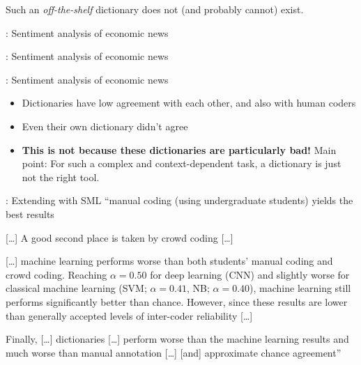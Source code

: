 \documentclass[compress]{beamer}
\begin{document}
\begin{frame}[standout]
	Such an \textit{off-the-shelf} dictionary does not (and probably cannot) exist.
\end{frame}



\begin{frame}{\cite{Boukes2020}: Sentiment analysis of economic news}
\end{frame}


\begin{frame}{\cite{Boukes2020}: Sentiment analysis of economic news}
\end{frame}


\begin{frame}{\cite{Boukes2020}: Sentiment analysis of economic news}
	\begin{itemize}
		\item Dictionaries have low agreement with each other, and also with human coders
		\item Even their own dictionary didn't agree
		\item \textbf{This is not because these dictionaries are particularly bad!} Main point: For such a complex and context-dependent task, a dictionary is just not the right tool.
	\end{itemize}
\end{frame}




\begin{frame}{\cite{VanAtteveldt2021}: Extending \cite{Boukes2020} with SML}
	``manual coding (using undergraduate students) yields the
	best results 
	
	[\ldots] A good second place is taken by crowd coding [\ldots]  
	
	
	[\ldots] machine learning performs worse than both students' manual coding and crowd coding.
	Reaching $\alpha = 0.50$ for deep learning (CNN) and slightly worse for classical machine learning (SVM; $\alpha = 0.41$, NB; $\alpha = 0.40$), machine learning still performs significantly better than chance. However, since these results are lower than generally accepted levels of inter-coder reliability [\ldots]
	
	Finally, [\ldots] dictionaries [\ldots] perform worse than the machine
	learning results and much worse than manual annotation [\ldots] [and] approximate chance agreement''\end{frame}
\end{document}
